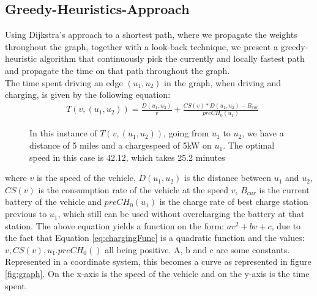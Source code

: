\subsection{Greedy-Heuristics-Approach}
Using Dijkstra's approach to a shortest path, where we propagate the weights throughout the graph, together with a look-back technique, we present a greedy-heuristic algorithm that continuously pick the currently and locally fastest path and propagate the time on that path throughout the graph.\\

The time spent driving an edge $(u_1, u_2)$ in the graph, when driving and charging, is given by the following equation:
\begin{equation}
\begin{aligned}
 & T(v,(u_1, u_2)) = \frac{D(u_1, u_2)}{v} + \frac{CS(v) * D(u_1, u_2) - B_{cur}}{preCH_0(u_1)}
\end{aligned}
\end{equation}\label{eq:drivingAndCharging}

\begin{figure}[!htb]
% 
\caption{In this instance of $T(v,(u_1, u_2))$, going from $u_1$ to $u_2$, we have a distance of 5 miles and a chargespeed of 5kW on $u_1$. The optimal speed in this case is 42.12, which takes 25.2 minutes}
\end{figure}\label{fig:graph}

where $v$ is the speed of the vehicle, $D(u_1, u_2)$ is the distance between $u_1$ and $u_2$,
$CS(v)$ is the consumption rate of the vehicle at the speed $v$, $B_{cur}$ is the current battery of the vehicle and $preCH_0(u_1)$ is the charge rate of best charge station previous to $u_1$, which still can be used without overcharging the battery at that station. The above equation yields a function on the form: $av^2 + bv + c$, due to the fact that Equation \ref{eq:chargingFunc} is a quadratic function and the values: $v, CS(v), u_1.preCH_0()$ all being positive.
A, b and c are some constants. Represented in a coordinate system, this becomes a curve as represented in figure \ref{fig:graph}. On the x-axis is the speed of the vehicle and on the y-axis is the time spent.

